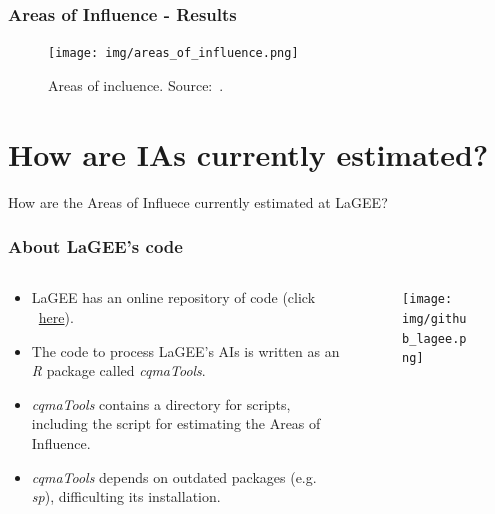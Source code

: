 \documentclass[aspectratio=169]{beamer}
\begin{document}
\begin{frame}
    \frametitle{Areas of Influence - Results}
    \begin{figure}
        \centering
        \texttt{[image: img/areas\_of\_influence.png]}
        \caption{Areas of incluence. Source:~\cite{cassol2020}.}
    \end{figure}
\end{frame}



\section{How are IAs currently estimated?}



\begin{frame}
    How are the Areas of Influece currently estimated at LaGEE?
\end{frame}

\begin{frame}
    \frametitle{About LaGEE's code}
    \begin{columns}
        \begin{column}{0.5\textwidth}
            \begin{itemize}
                \item LaGEE has an online repository of code (click
                    ~\href{https://github.com/INPE-LAGEE}{here}).
                \item The code to process LaGEE's AIs is written as an 
                    \textit{R} package called \textit{cqmaTools}.
                \item \textit{cqmaTools} contains a directory for scripts, 
                    including the script for estimating the Areas of Influence.
                \item \textit{cqmaTools} depends on outdated packages 
                    (e.g. \textit{sp}), difficulting its installation.
            \end{itemize}
        \end{column}
        \begin{column}{0.5\textwidth}
            \begin{figure}
                \centering
                \texttt{[image: img/github\_lagee.png]}
            \end{figure}
        \end{column}
    \end{columns}
\end{frame}
\end{document}
